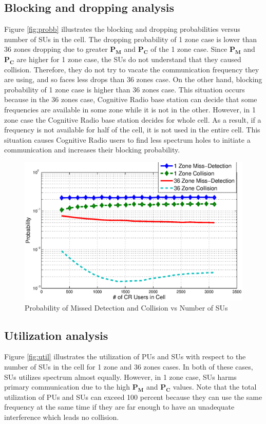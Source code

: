 \documentclass[conference,compsoc]{IEEEtran}
\newcommand{\probm}{\mathbf{P_M}}
\newcommand{\CR}{Cognitive Radio }
\begin{document}
\subsection{Blocking and dropping analysis}
Figure \ref{fig:probb} illustrates the blocking and dropping probabilities versus number of SUs in the cell. The dropping probability of 1 zone case is lower than 36 zones dropping due to greater $\probm$ and $\mathbf{P_C}$ of the 1 zone case. Since $\probm$ and $\mathbf{P_C}$ are higher for 1 zone case, the SUs do not understand that they caused collision. Therefore, they do not try to vacate the communication frequency they are using, and so faces less drops than 36 zones case. On the other hand, blocking probability of 1 zone case is higher than 36 zones case. This situation occurs because in the 36 zones case, \CR base station can decide that some frequencies are available in some zone while it is not in the other. However, in 1 zone case the \CR base station decides for whole cell. As a result, if a frequency is not available for half of the cell, it is  not used in the entire cell. This situation causes \CR users to find less spectrum holes to initiate a communication and increases their blocking probability.

\begin{figure}[t]
\centering
\includegraphics[width=0.99\columnwidth,keepaspectratio] {figs/pm_c.eps}
\caption{Probability of Missed Detection and Collision vs Number of
SUs} \label{fig:probm}
\end{figure}


\subsection{Utilization analysis}
Figure \ref{fig:util} illustrates the utilization of PUs and SUs with respect to the number of SUs in the cell for 1 zone and 36 zones cases. In both of these cases, SUs utilizes spectrum almost equally. However, in 1 zone case, SUs harms primary communication due to the high $\probm$ and $\mathbf{P_C}$ values. Note that the total utilization of PUs and SUs can exceed 100 percent because they can use the same frequency at the same time if they are far enough to have an unadequate interference which leads no collision. 
\end{document}
